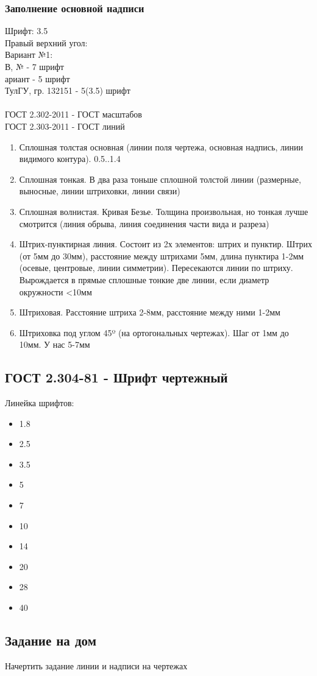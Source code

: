 \documentclass[a4paper, 11pt, oneside]{article}
\begin{document}
\subsubsection{Заполнение основной надписи}
Шрифт: 3.5\\
Правый верхний угол:\\
Вариант №1:\\
В, № - 7 шрифт\\
ариант - 5 шрифт\\
ТулГУ, гр. 132151 - 5(3.5) шрифт\\\\
ГОСТ 2.302-2011 - ГОСТ масштабов\\
ГОСТ 2.303-2011 - ГОСТ линий
\begin{enumerate}
	\item Сплошная толстая основная (линии поля чертежа, основная надпись, линии видимого контура). 0.5..1.4
	\item Сплошная тонкая. В два раза тоньше сплошной толстой линии (размерные, выносные, 
		линии штриховки, линии связи)
	\item Сплошная волнистая. Кривая Безье. Толщина произвольная, но тонкая лучше смотрится
		(линия обрыва, линия соединения части вида и разреза)
	\item Штрих-пунктирная линия. Состоит из 2х элементов: штрих и пунктир. Штрих (от 5мм до 30мм),
		расстояние между штрихами 5мм, длина пунктира 1-2мм (осевые, центровые, линии симметрии). 
		Пересекаются линии по штриху. Вырождается в прямые сплошные
		тонкие две линии, если диаметр окружности <10мм
	\item Штриховая. Расстояние штриха 2-8мм, расстояние между ними 1-2мм
	\item Штриховка под углом 45º (на ортогональных чертежах). Шаг от 1мм до 10мм. У нас 5-7мм
\end{enumerate}
\subsection{ГОСТ 2.304-81 - Шрифт чертежный}
Линейка шрифтов:
\begin{itemize}
	\item 1.8
	\item 2.5
	\item 3.5
	\item 5
	\item 7
	\item 10
	\item 14
	\item 20
	\item 28
	\item 40
\end{itemize}

\subsection{Задание на дом}
Начертить задание линии и надписи на чертежах
\end{document}
